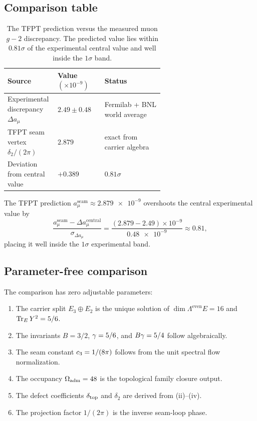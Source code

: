\subsection{Comparison table}

\begin{table}[ht]
\centering
\begin{tabularx}{\linewidth}{@{}>{\raggedright\arraybackslash}p{0.32\linewidth}
    >{\centering\arraybackslash}p{0.30\linewidth}
    >{\centering\arraybackslash}X@{}}
\toprule
Source & Value $(\times10^{-9})$ & Status \\
\midrule
Experimental discrepancy $\Delta a_\mu$ & $2.49\pm0.48$ & Fermilab + BNL world average \\
TFPT seam vertex $\delta_2/(2\pi)$ & $2.879$ & exact from carrier algebra \\
\midrule
Deviation from central value & $+0.389$ & $0.81\sigma$ \\
\bottomrule
\end{tabularx}
\caption{The TFPT prediction versus the measured muon $g-2$ discrepancy. The
predicted value lies within $0.81\sigma$ of the experimental central value and
well inside the $1\sigma$ band.}
\label{tab:comparison}
\end{table}

The TFPT prediction $a_\mu^{\mathrm{seam}}\approx\num{2.879e-9}$ overshoots
the central experimental value by
\[
\frac{a_\mu^{\mathrm{seam}}-\Delta a_\mu^{\mathrm{central}}}{\sigma_{\Delta a_\mu}}
=
\frac{(\num{2.879}-\num{2.49})\times10^{-9}}{\num{0.48e-9}}
\approx
0.81,
\]
placing it well inside the $1\sigma$ experimental band.

\subsection{Parameter-free comparison}

The comparison has zero adjustable parameters:

\begin{enumerate}[label=(\roman*), leftmargin=1.6em, itemsep=0.25em]
\item The carrier split $E_3\oplus E_2$ is the unique solution of
      $\dim\Lambda^{\mathrm{even}}E=16$ and $\operatorname{Tr}_EY^2=5/6$.
\item The invariants $B=3/2$, $\gamma=5/6$, and $B\gamma=5/4$ follow
      algebraically.
\item The seam constant $c_3=1/(8\pi)$ follows from the unit spectral
      flow normalization.
\item The occupancy $\Omega_{\mathrm{adm}}=48$ is the topological family closure output.
\item The defect coefficients $\delta_{\mathrm{top}}$ and $\delta_2$ are derived from
      (ii)--(iv).
\item The projection factor $1/(2\pi)$ is the inverse seam-loop phase.
\end{enumerate}

